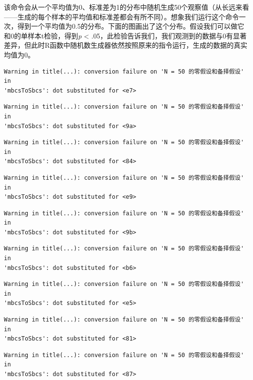 \documentclass[
  letterpaper,
  DIV=11,
  numbers=noendperiod]{scrreprt}
\begin{document}
该命令会从一个平均值为0、标准差为1的分布中随机生成50个观察值（从长远来看------生成的每个样本的平均值和标准差都会有所不同）。想象我们运行这个命令一次，得到一个平均值为0.5的分布。下面的图画出了这个分布。假设我们可以做它和0的单样本t检验，得到\emph{p}
\textless{}
.05，此检验告诉我们，我们观测到的数据与0有显著差异，但此时R函数中随机数生成器依然按照原来的指令运行，生成的数据的真实均值为0。

\begin{verbatim}
Warning in title(...): conversion failure on 'N = 50 的零假设和备择假设' in
'mbcsToSbcs': dot substituted for <e7>
\end{verbatim}

\begin{verbatim}
Warning in title(...): conversion failure on 'N = 50 的零假设和备择假设' in
'mbcsToSbcs': dot substituted for <9a>
\end{verbatim}

\begin{verbatim}
Warning in title(...): conversion failure on 'N = 50 的零假设和备择假设' in
'mbcsToSbcs': dot substituted for <84>
\end{verbatim}

\begin{verbatim}
Warning in title(...): conversion failure on 'N = 50 的零假设和备择假设' in
'mbcsToSbcs': dot substituted for <e9>
\end{verbatim}

\begin{verbatim}
Warning in title(...): conversion failure on 'N = 50 的零假设和备择假设' in
'mbcsToSbcs': dot substituted for <9b>
\end{verbatim}

\begin{verbatim}
Warning in title(...): conversion failure on 'N = 50 的零假设和备择假设' in
'mbcsToSbcs': dot substituted for <b6>
\end{verbatim}

\begin{verbatim}
Warning in title(...): conversion failure on 'N = 50 的零假设和备择假设' in
'mbcsToSbcs': dot substituted for <e5>
\end{verbatim}

\begin{verbatim}
Warning in title(...): conversion failure on 'N = 50 的零假设和备择假设' in
'mbcsToSbcs': dot substituted for <81>
\end{verbatim}

\begin{verbatim}
Warning in title(...): conversion failure on 'N = 50 的零假设和备择假设' in
'mbcsToSbcs': dot substituted for <87>
\end{verbatim}
\end{document}
